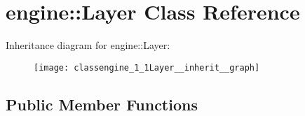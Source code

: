 \hypertarget{classengine_1_1Layer}{}\section{engine\+:\+:Layer Class Reference}
\label{classengine_1_1Layer}


Inheritance diagram for engine\+:\+:Layer\+:\nopagebreak
\begin{figure}[H]
\begin{center}
\leavevmode
\texttt{[image: classengine\_1\_1Layer\_\_inherit\_\_graph]}
\end{center}
\end{figure}
\subsection*{Public Member Functions}
